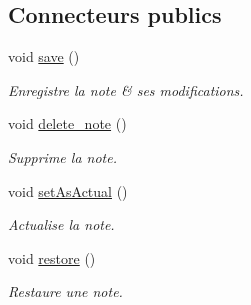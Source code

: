 \subsection*{Connecteurs publics}
\begin{DoxyCompactItemize}
\item 
\hypertarget{class_note_editeur_a605b1bca885c25460cb7d8863d1f3d03}{void \hyperlink{class_note_editeur_a605b1bca885c25460cb7d8863d1f3d03}{save} ()}\label{class_note_editeur_a605b1bca885c25460cb7d8863d1f3d03}

\begin{DoxyCompactList}\small\item\em Enregistre la note \& ses modifications. \end{DoxyCompactList}\item 
\hypertarget{class_note_editeur_a2918e7a3ddc7dfac7e2ce13589d00288}{void \hyperlink{class_note_editeur_a2918e7a3ddc7dfac7e2ce13589d00288}{delete\-\_\-note} ()}\label{class_note_editeur_a2918e7a3ddc7dfac7e2ce13589d00288}

\begin{DoxyCompactList}\small\item\em Supprime la note. \end{DoxyCompactList}\item 
\hypertarget{class_note_editeur_a857f285628a0b7dcb6a69b18c977aa71}{void \hyperlink{class_note_editeur_a857f285628a0b7dcb6a69b18c977aa71}{set\-As\-Actual} ()}\label{class_note_editeur_a857f285628a0b7dcb6a69b18c977aa71}

\begin{DoxyCompactList}\small\item\em Actualise la note. \end{DoxyCompactList}\item 
\hypertarget{class_note_editeur_a090e4299bb4ef113bb93d23d50d83bab}{void \hyperlink{class_note_editeur_a090e4299bb4ef113bb93d23d50d83bab}{restore} ()}\label{class_note_editeur_a090e4299bb4ef113bb93d23d50d83bab}

\begin{DoxyCompactList}\small\item\em Restaure une note. \end{DoxyCompactList}\end{DoxyCompactItemize}
